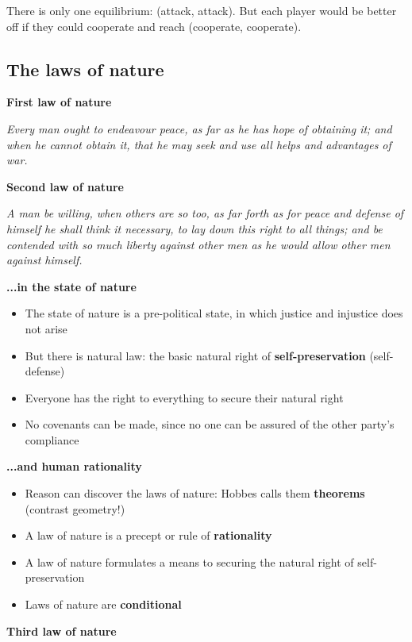 There is only one equilibrium: (attack, attack). But each player would be
better off if they could cooperate and reach (cooperate, cooperate).

\subsection{The laws of nature}

\textbf{First law of nature}

\textit{Every man ought to endeavour peace, as far as he has hope of
obtaining it; and when he cannot obtain it, that he may seek and use all helps
and advantages of war.}

\textbf{Second law of nature}

\textit{A man be willing, when others are so too, as far forth as for peace
and defense of himself he shall think it necessary, to lay down this right
to all things; and be contended with so much liberty against other men as he
would allow other men against himself.}

\textbf{...in the state of nature}

\begin{itemize}
    \item The state of nature is a pre-political state, in which justice and
    injustice does not arise
    \item But there is natural law: the basic natural right of \textbf{
    self-preservation} (self-defense)
    \item Everyone has the right to everything to secure their natural right
    \item No covenants can be made, since no one can be assured of the other
    party's compliance
\end{itemize}

\textbf{...and human rationality}

\begin{itemize}
    \item Reason can discover the laws of nature: Hobbes calls them
    \textbf{theorems} (contrast geometry!)
    \item A law of nature is a precept or rule of \textbf{rationality}
    \item A law of nature formulates a means to securing the natural right of
    self-preservation
    \item Laws of nature are \textbf{conditional}
\end{itemize}

\textbf{Third law of nature}

